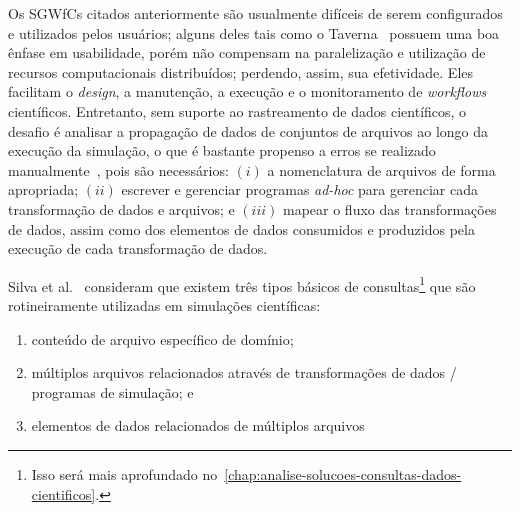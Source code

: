 Os SGWfCs citados anteriormente são usualmente difíceis de serem configurados e utilizados pelos usuários; alguns deles tais como o Taverna~\cite{hull2006taverna} possuem uma boa ênfase em usabilidade, porém não compensam na paralelização e utilização de recursos computacionais distribuídos; perdendo, assim, sua efetividade.
Eles facilitam o \textit{design}, a manutenção, a execução e o monitoramento de \textit{workflows} científicos. Entretanto, sem suporte ao rastreamento de dados científicos, o desafio é analisar a propagação de dados de conjuntos de arquivos ao longo da execução da simulação, o que é bastante propenso a erros se realizado manualmente~\cite{silva2015analyzing}, pois são necessários: \( (i) \) a nomenclatura de arquivos de forma apropriada; \( (ii) \) escrever e gerenciar programas \textit{ad-hoc} para gerenciar cada transformação de dados e arquivos; e \( (iii) \) mapear o fluxo das transformações de dados, assim como dos elementos de dados consumidos e produzidos pela execução de cada transformação de dados.


Silva et al.~\cite{silva2015analyzing} consideram que existem três tipos básicos de consultas\footnote{Isso será mais aprofundado no~\autoref{chap:analise-solucoes-consultas-dados-cientificos}.} que são rotineiramente utilizadas em simulações científicas:

\begin{enumerate}
    \item conteúdo de arquivo específico de domínio;
    \item múltiplos arquivos relacionados através de transformações de dados / programas de simulação; e
    \item elementos de dados relacionados de múltiplos arquivos
\end{enumerate}


